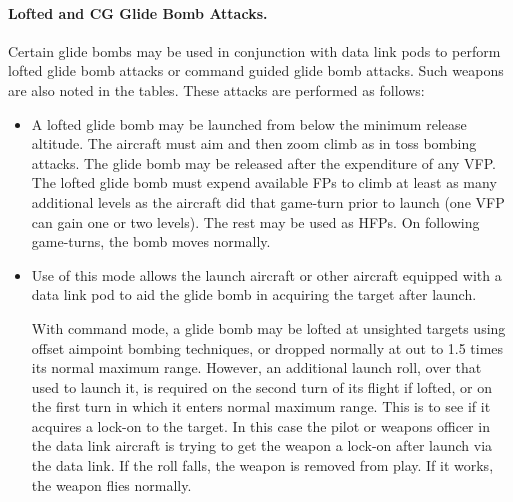 \paragraph{Lofted and CG Glide Bomb Attacks.} Certain glide bombs may be used in conjunction with data link pods to perform lofted glide bomb attacks or command guided glide bomb attacks. Such weapons are also noted in the tables. These attacks are performed as follows:

\begin{itemize}

    \item{} A lofted glide bomb may be launched from below the minimum release altitude. The aircraft must aim and then zoom climb as in toss bombing attacks. The glide bomb may be released after the expenditure of any VFP. The lofted glide bomb must expend available FPs to climb at least as many additional levels as the aircraft did that game-turn prior to launch (one VFP can gain one or two levels). The rest may be used as HFPs. On following game-turns, the bomb moves normally.

    \item{} Use of this mode allows the launch aircraft or other aircraft equipped with a data link pod to aid the glide bomb in acquiring the target after launch.

    With command mode, a glide bomb may be lofted at unsighted targets using offset aimpoint bombing techniques, or dropped normally at out to 1.5 times its normal maximum range. However, an additional launch roll, over that used to launch it, is required on the second turn of its flight if lofted, or on the first turn in which it enters normal maximum range. This is to see if it acquires a lock-on to the target. In this case the pilot or weapons officer in the data link aircraft is trying to get the weapon a lock-on after launch via the data link. If the roll falls, the weapon is removed from play. If it works, the weapon flies normally.

\end{itemize}


